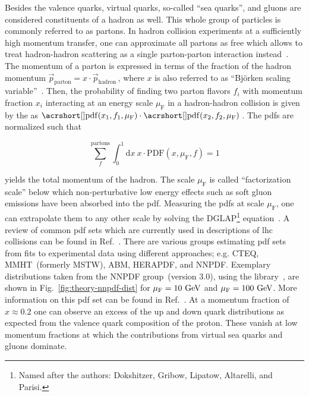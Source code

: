 Besides the valence quarks, virtual quarks, so-called ``sea quarks'', and gluons are considered constituents of a hadron as well. This whole group of particles is commonly referred to as partons. In hadron collision experiments at a sufficiently high momentum transfer, one can approximate all partons as free which allows to treat hadron-hadron scattering as a single parton-parton interaction instead~\cite{Feynman:1969wa}. The momentum of a parton is expressed in terms of the fraction of the hadron momentum $\vec{p}_\mathrm{parton}=x\cdot \vec{p}_\mathrm{hadron}\,$, where $x$ is also referred to as ``Bj\"orken scaling variable''~\cite{Bjorken:1967fb}. Then, the probability of 
finding two parton flavors $f_{i}$ with momentum fraction $x_{i}$ interacting at an energy scale $\mu_\mathrm{F}$ in a hadron-hadron collision is given by the  as $\mathrm{\gls{pdf}}(x_{1},f_{1},\mu_\mathrm{F})\cdot\mathrm{\gls{pdf}}(x_{2},f_{2},\mu_\mathrm{F})\,$. The \glspl{pdf} are normalized such that

\begin{equation}
\sum_{f}^\mathrm{partons}\int_{0}^{1}\mathrm{d}x~x\cdot \mathrm{PDF}(x,\mu_\mathrm{F},f)=1
\end{equation}

yields the total momentum of the hadron. The scale $\mu_\mathrm{F}$ is called ``factorization scale'' below which non-perturbative low energy effects such as soft gluon emissions have been absorbed into the \gls{pdf}. Measuring the \glspl{pdf} at scale $\mu_\mathrm{F}$, one can extrapolate them to any other scale by solving the DGLAP\footnote{Named after the authors: Dokshitzer, Gribow, Lipatow, Altarelli, and Parisi.} equation~\cite{Dokshitzer:1977sg,Gribov:1972ri,Altarelli:1977zs}. A review of common \gls{pdf} sets which are currently used in descriptions of \gls{lhc} collisions can be found in Ref.~\cite{Accardi2016}. There are various groups estimating \gls{pdf} sets from fits to experimental data using different approaches; e.g. CTEQ, MMHT~(formerly MSTW), ABM, HERAPDF, and NNPDF. Exemplary distributions taken from the NNPDF group~(version 3.0), using the \LHAPDF[format=hyperbf] library~\cite{Buckley:2014ana}, are shown in Fig.~\ref{fig:theory-nnpdf-dist} for $\mu_\mathrm{F}=10~\textrm{GeV}$ and $\mu_\mathrm{F}=100~\textrm{GeV}$. More information on this \gls{pdf} set can be found in Ref.~\cite{Ball:2014uwa}. At a momentum fraction of $x\approx0.2$ one can observe an excess of the up and down quark distributions as expected from the valence quark composition of the proton. These vanish at low momentum fractions at which the contributions from virtual sea quarks and gluons dominate.

